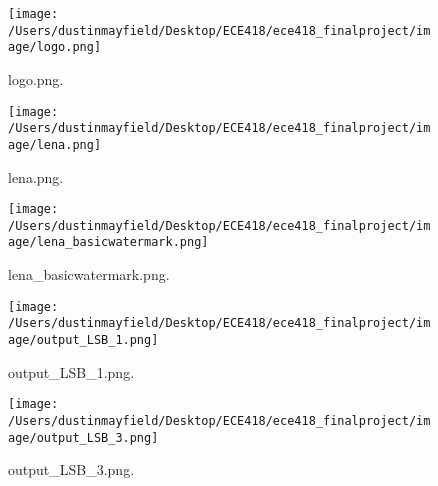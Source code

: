 \documentclass[]{article}
\begin{document}
\newpage

\begin{figure}
\centering
\texttt{[image: /Users/dustinmayfield/Desktop/ECE418/ece418\_finalproject/image/logo.png]}
\caption{logo.png.}
\end{figure}

\begin{figure}
\centering
\texttt{[image: /Users/dustinmayfield/Desktop/ECE418/ece418\_finalproject/image/lena.png]}
\caption{lena.png.}
\end{figure}

\begin{figure}
\centering
\texttt{[image: /Users/dustinmayfield/Desktop/ECE418/ece418\_finalproject/image/lena\_basicwatermark.png]}
\caption{lena\_basicwatermark.png.}
\end{figure}

\newpage

\begin{figure}
\centering
\texttt{[image: /Users/dustinmayfield/Desktop/ECE418/ece418\_finalproject/image/output\_LSB\_1.png]}
\caption{output\_LSB\_1.png.}
\end{figure}

\begin{figure}
\centering
\texttt{[image: /Users/dustinmayfield/Desktop/ECE418/ece418\_finalproject/image/output\_LSB\_3.png]}
\caption{output\_LSB\_3.png.}
\end{figure}
\end{document}
